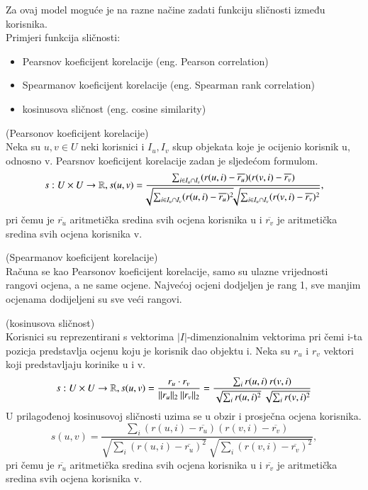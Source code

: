 \documentclass[a4paper,oneside,12pt]{memoir} %
\begin{document}
\bigskip
Za ovaj model moguće je na razne načine zadati funkciju sličnosti između korisnika.
\bigskip
\\Primjeri funkcija sličnosti:
\begin{itemize}[topsep=2pt]
\setlength{\parskip}{0pt}
\item Pearsnov koeficijent korelacije (eng. Pearson correlation)
\item Spearmanov koeficijent korelacije (eng. Spearman rank correlation)
\item kosinusova sličnost (eng. cosine similarity)
\end{itemize}
\begin{defn} (Pearsonov koeficijent korelacije)
\\Neka su $u, v\in U$ neki korisnici i $I_u, I_v$ skup objekata koje je ocijenio korisnik u, odnosno v. Pearsnov koeficijent korelacije zadan je sljedećom formulom.
\[ s:U\times U \rightarrow \mathbb{R}, s(u,v) = \frac{\sum_{i\in I_u\cap I_v}(r(u,i)-\overline{r_u})(r(v,i)-\overline{r_v})}{\sqrt[]{\sum_{i\in I_u\cap I_v}(r(u,i)-\overline{r_u})^2} \sqrt[]{\sum_{i\in I_u\cap I_v}(r(v,i)-\overline{r_v})^2} },  \]
pri čemu je $\overline{r_u}$ aritmetička sredina svih ocjena korisnika u i $\overline{r_v}$ je aritmetička sredina svih ocjena korisnika v.
\end{defn}
%
\begin{rem} (Spearmanov koeficijent korelacije)
\\Računa se kao Pearsonov koeficijent korelacije, samo su ulazne vrijednosti rangovi ocjena, a ne same ocjene. Najvećoj ocjeni dodjeljen je rang 1, sve manjim ocjenama dodijeljeni su sve veći rangovi.
\end{rem}
%
\begin{defn} (kosinusova sličnost)
\\Korisnici su reprezentirani s vektorima $|I|$-dimenzionalnim vektorima pri čemi i-ta pozicja predstavlja ocjenu koju je korisnik dao objektu i. Neka su $r_u$ i $r_v$ vektori koji predstavljaju korinike u i v.
\[ s:U\times U \rightarrow \mathbb{R}, s(u,v) = \frac{r_u\cdot r_v}{||r_u||_2 \: ||r_v||_2} = \frac{\sum_i r(u,i)\: r(v,i) }{\sqrt{\sum_i r(u,i)^2}\:\sqrt{\sum_i r(v,i)^2}}  \]
U prilagođenoj kosinusovoj sličnosti uzima se u obzir i prosječna ocjena korisnika.
\[ s(u,v) = \frac{\sum_i (r(u,i)-\overline{r_u})(r(v,i)-\overline{r_v}) }{\sqrt{\sum_i (r(u,i)-\overline{r_u})^2}\:\sqrt{\sum_i (r(v,i)-\overline{r_v})^2}},  \] 
pri čemu je $\overline{r_u}$ aritmetička sredina svih ocjena korisnika u i $\overline{r_v}$ je aritmetička sredina svih ocjena korisnika v.
\end{defn}
%
\end{document}
